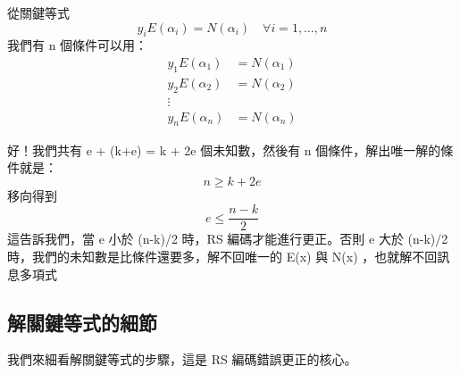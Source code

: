 \documentclass[
]{article}
\begin{document}
從關鍵等式 \[
y_{i}E(\alpha_{i}) = N(\alpha_{i})
\quad \forall i=1,\dots,n
\] 我們有 n 個條件可以用： \[
\begin{aligned}
y_{1}E(\alpha_{1}) &= N(\alpha_{1})\\
y_{2}E(\alpha_{2}) &= N(\alpha_{2})\\
\vdots\\
y_{n}E(\alpha_{n}) &= N(\alpha_{n})
\end{aligned}
\]

好！我們共有 e + (k+e) = k + 2e 個未知數，然後有 n
個條件，解出唯一解的條件就是： \[
n \ge k+2e
\] 移向得到 \[
e \le \frac{n-k}{2}
\] 這告訴我們，當 e 小於 (n-k)/2 時，RS 編碼才能進行更正。否則 e 大於
(n-k)/2 時，我們的未知數是比條件還要多，解不回唯一的 E(x) 與 N(x)
，也就解不回訊息多項式

\hypertarget{ux89e3ux95dcux9375ux7b49ux5f0fux7684ux7d30ux7bc0}{%
\subsection{解關鍵等式的細節}\label{ux89e3ux95dcux9375ux7b49ux5f0fux7684ux7d30ux7bc0}}

我們來細看解關鍵等式的步驟，這是 RS 編碼錯誤更正的核心。
\end{document}
